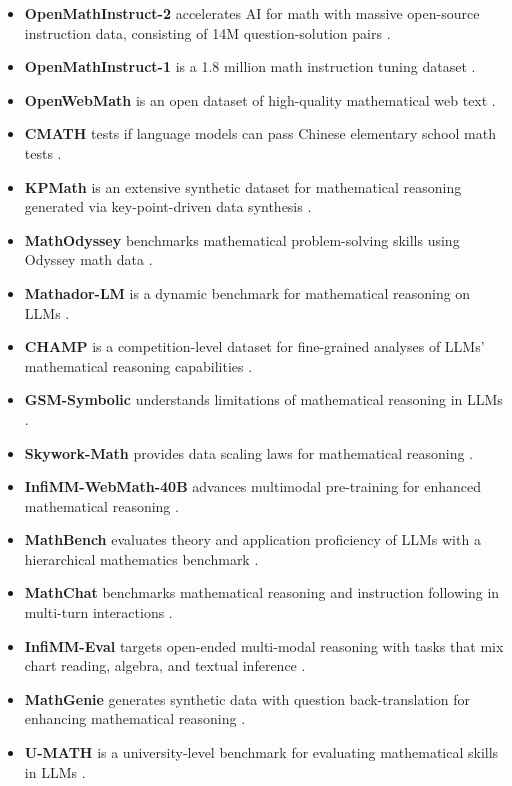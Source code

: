 \documentclass[acmsmall,anonymous]{acmart}
\begin{document}
\begin{itemize}
    \item \textbf{OpenMathInstruct-2} accelerates AI for math with massive open-source instruction data, consisting of 14M question-solution pairs \cite{toshniwal2024a openmathinstruct2}.
    \item \textbf{OpenMathInstruct-1} is a 1.8 million math instruction tuning dataset \cite{toshniwal2024b openmathinstruct1}.
    \item \textbf{OpenWebMath} is an open dataset of high-quality mathematical web text \cite{paster2024openwebmath}.
    \item \textbf{CMATH} tests if language models can pass Chinese elementary school math tests \cite{wei2023cmath}.
    \item \textbf{KPMath} is an extensive synthetic dataset for mathematical reasoning generated via key-point-driven data synthesis \cite{huang2024key}.
    \item \textbf{MathOdyssey} benchmarks mathematical problem-solving skills using Odyssey math data \cite{fang2024}.
    \item \textbf{Mathador-LM} is a dynamic benchmark for mathematical reasoning on LLMs \cite{kurtic2024}.
    \item \textbf{CHAMP} is a competition-level dataset for fine-grained analyses of LLMs' mathematical reasoning capabilities \cite{mao2024}.
    \item \textbf{GSM-Symbolic} understands limitations of mathematical reasoning in LLMs \cite{mirzadeh2024}.
    \item \textbf{Skywork-Math} provides data scaling laws for mathematical reasoning \cite{zeng2024}.
    \item \textbf{InfiMM-WebMath-40B} advances multimodal pre-training for enhanced mathematical reasoning \cite{han2024}.
    \item \textbf{MathBench} evaluates theory and application proficiency of LLMs with a hierarchical mathematics benchmark \cite{liu2024b}.
    \item \textbf{MathChat} benchmarks mathematical reasoning and instruction following in multi-turn interactions \cite{liang2024c}.
    \item \textbf{InfiMM-Eval} targets open-ended multi-modal reasoning with tasks that mix chart reading, algebra, and textual inference \cite{han2023infimmevalcomplexopenendedreasoning}.
    \item \textbf{MathGenie} generates synthetic data with question back-translation for enhancing mathematical reasoning \cite{lu2024b}.
    \item \textbf{U-MATH} is a university-level benchmark for evaluating mathematical skills in LLMs \cite{chernyshev2024}.
\end{itemize}
\end{document}
